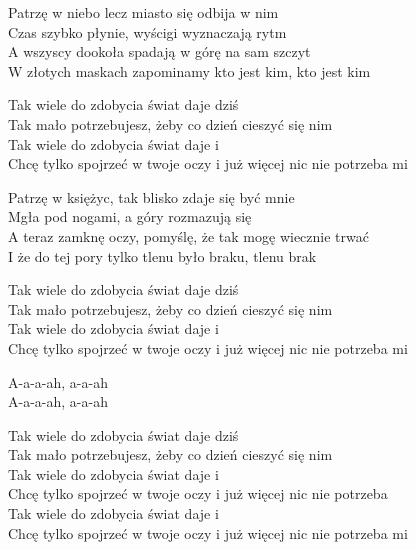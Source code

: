 \begin{text}
    Patrzę w niebo lecz miasto się odbija w nim\\
    Czas szybko płynie, wyścigi wyznaczają rytm\\
    A wszyscy dookoła spadają w górę na sam szczyt\\
    W złotych maskach zapominamy kto jest kim, kto jest kim

    Tak wiele do zdobycia świat daje dziś\\
    Tak mało potrzebujesz, żeby co dzień cieszyć się nim\\
    Tak wiele do zdobycia świat daje i\\
    Chcę tylko spojrzeć w twoje oczy i już więcej nic nie potrzeba mi

    Patrzę w księżyc, tak blisko zdaje się być mnie\\
    Mgła pod nogami, a góry rozmazują się\\
    A teraz zamknę oczy, pomyślę, że tak mogę wiecznie trwać\\
    I że do tej pory tylko tlenu było braku, tlenu brak

    Tak wiele do zdobycia świat daje dziś\\
    Tak mało potrzebujesz, żeby co dzień cieszyć się nim\\
    Tak wiele do zdobycia świat daje i\\
    Chcę tylko spojrzeć w twoje oczy i już więcej nic nie potrzeba mi

    A-a-a-ah, a-a-ah\\
    A-a-a-ah, a-a-ah

    Tak wiele do zdobycia świat daje dziś\\
    Tak mało potrzebujesz, żeby co dzień cieszyć się nim\\
    Tak wiele do zdobycia świat daje i\\
    Chcę tylko spojrzeć w twoje oczy i już więcej nic nie potrzeba\\
    Tak wiele do zdobycia świat daje i\\
    Chcę tylko spojrzeć w twoje oczy i już więcej nic nie potrzeba mi
\end{text}
\begin{chord}

\end{chord}